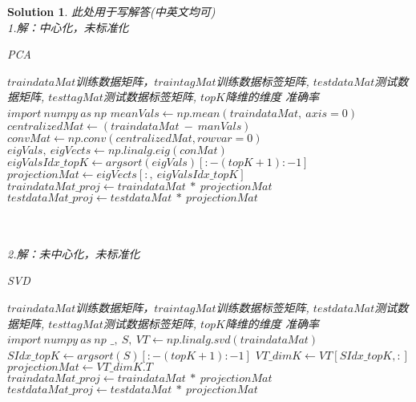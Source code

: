 \documentclass[a4paper,UTF8]{article}
\numberwithin{equation}{section}
\newtheorem*{solution}{Solution}
\begin{document}
\begin{solution}
	此处用于写解答(中英文均可)\\
\newpage
\noindent
1.解：中心化，未标准化
\begin{algorithm}  
	\caption{PCA}  
	\begin{algorithmic}[1] %
		\Require $traindataMat$训练数据矩阵，$traintagMat$训练数据标签矩阵, $testdataMat$测试数据矩阵, $testtagMat$测试数据标签矩阵, $topK$降维的维度  
		\Ensure 准确率  
		\State $import\ numpy\ as\ np$
		\State $meanVals \gets np.mean(traindataMat,\ axis=0)$
		\State $centralizedMat \gets (traindataMat\ -\ manVals)$
		\State $convMat \gets np.conv(centralizedMat, rowvar=0)$
		\State $eigVals,\ eigVects \gets np.linalg.eig(conMat)$
		\State $eigValsIdx\_topK \gets argsort(eigVals)[:-(topK+1):-1]$
		\State $projectionMat \gets eigVects[:,\ eigValsIdx\_topK]$
		\State $traindataMat\_proj \gets traindataMat\ *\ projectionMat$
		\State $testdataMat\_proj \gets testdataMat\ *\ projectionMat$
		\State {}
	\end{algorithmic}  
\end{algorithm}
\\\\
2.解：未中心化，未标准化
\begin{algorithm}
	\caption{SVD}
	\begin{algorithmic}[1]
		\Require $traindataMat$训练数据矩阵，$traintagMat$训练数据标签矩阵, $testdataMat$测试数据矩阵, $testtagMat$测试数据标签矩阵, $topK$降维的维度
		\Ensure 准确率
		\State $import\ numpy\ as\ np$
		\State $\_,\ S,\ VT \gets np.linalg.svd(traindataMat)$
		\State $SIdx\_topK \gets argsort(S)[:-(topK+1):-1]$
		\State $VT\_dimK \gets VT[SIdx\_topK,:]$
        \State $projectionMat \gets VT\_dimK.T$
        \State $traindataMat\_proj \gets traindataMat\ *\ projectionMat$
		\State $testdataMat\_proj \gets testdataMat\ *\ projectionMat$
		\State {}
	\end{algorithmic}
\end{algorithm}


\end{solution}
\end{document}
